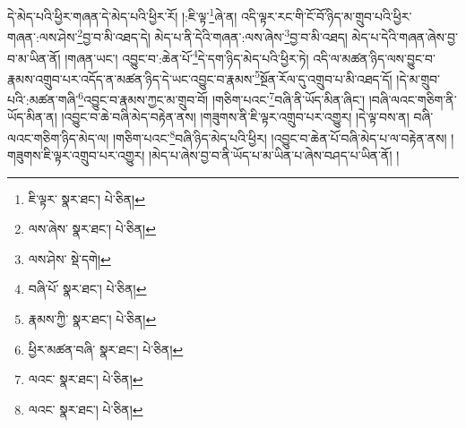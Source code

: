 དེ་མེད་པའི་ཕྱིར་གཞན་དེ་མེད་པའི་ཕྱིར་རོ། །:ཇི་ལྟ་\footnote{ཇི་ལྟར་  སྣར་ཐང་།  པེ་ཅིན། }ཞེ་ན། འདི་ལྟར་རང་གི་ངོ་བོ་ཉིད་མ་གྲུབ་པའི་ཕྱིར་གཞན་:ལས་ཤེས་\footnote{ལས་ཞེས་  སྣར་ཐང་།  པེ་ཅིན། }བྱ་བ་མི་འཐད་དེ། མེད་པ་ནི་དེའི་གཞན་:ལས་ཞེས་\footnote{ལས་ཤེས་  སྡེ་དགེ། }བྱ་བ་མི་འཐད། མེད་པ་དེའི་གཞན་ཞེས་བྱ་བ་མ་ཡིན་ནོ། །གཞན་ཡང་། འབྱུང་བ་:ཆེན་པོ་\footnote{བཞི་པོ་  སྣར་ཐང་།  པེ་ཅིན། }དེ་དག་ཉིད་མེད་པའི་ཕྱིར་ཏེ། འདི་ལ་མཚན་ཉིད་ལས་བྱུང་བ་རྣམས་འགྲུབ་པར་འདོད་ན་མཚན་ཉིད་དེ་ཡང་འབྱུང་བ་རྣམས་\footnote{རྣམས་ཀྱི་  སྣར་ཐང་།  པེ་ཅིན། }སྔོན་རོལ་དུ་འགྲུབ་པ་མི་འཐད་དོ། །དེ་མ་གྲུབ་པའི་:མཚན་གཞི་\footnote{ཕྱིར་མཚན་བཞི་  སྣར་ཐང་།  པེ་ཅིན། }འབྱུང་བ་རྣམས་ཀྱང་མ་གྲུབ་བོ། །གཅིག་པའང་\footnote{ལའང་  སྣར་ཐང་།  པེ་ཅིན། }བཞི་ནི་ཡོད་མིན་ཞིང་། །བཞི་ལའང་གཅིག་ནི་ཡོད་མིན་ན། །འབྱུང་བ་ཆེ་བཞི་མེད་བརྟེན་ནས། །གཟུགས་ནི་ཇི་ལྟར་འགྲུབ་པར་འགྱུར། །དེ་ལྟ་བས་ན། བཞི་ལའང་གཅིག་ཉིད་མེད་ལ། །གཅིག་པའང་\footnote{ལའང་  སྣར་ཐང་།  པེ་ཅིན། }བཞི་ཉིད་མེད་པའི་ཕྱིར། །འབྱུང་བ་ཆེན་པོ་བཞི་མེད་པ་ལ་བརྟེན་ནས། །གཟུགས་ཇི་ལྟར་འགྲུབ་པར་འགྱུར། །མེད་པ་ཞེས་བྱ་བ་ནི་ཡོད་པ་མ་ཡིན་པ་ཞེས་བཤད་པ་ཡིན་ནོ། །
